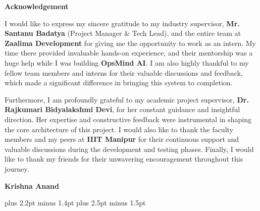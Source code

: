 \documentclass[a4paper, 11pt, oneside]{report}
\begin{document}

\newpage
{}
{}
\begin{center}
    { \LARGE \textbf{Acknowledgement}}
\end{center}
\vspace{1.0cm}
{\onehalfspacing
I would like to express my sincere gratitude to my industry supervisor, \textbf{Mr. Santanu Badatya} (Project Manager \& Tech Lead), and the entire team at \textbf{Zaalima Development} for giving me the opportunity to work as an intern. My time there provided invaluable hands-on experience, and their mentorship was a huge help while I was building \textbf{OpsMind AI}. I am also highly thankful to my fellow team members and interns for their valuable discussions and feedback, which made a significant difference in bringing this system to completion.

Furthermore, I am profoundly grateful to my academic project supervisor, \textbf{Dr. Rajkumari Bidyalakshmi Devi}, for her constant guidance and insightful direction. Her expertise and constructive feedback were instrumental in shaping the core architecture of this project. I would also like to thank the faculty members and my peers at \textbf{IIIT Manipur} for their continuous support and valuable discussions during the development and testing phases. Finally, I would like to thank my friends for their unwavering encouragement throughout this journey.\par}

\vspace{1.5cm}
\begin{flushright}
\textbf{Krishna Anand}
\end{flushright}


\newpage
\tableofcontents
\listoffigures
\listoftables


\newpage
{}
\setcounter{page}{1}
\onehalfspacing
\spaceskip=4.5pt plus 2.2pt minus 1.4pt
\xspaceskip=5.5pt plus 2.5pt minus 1.5pt
\end{document}
